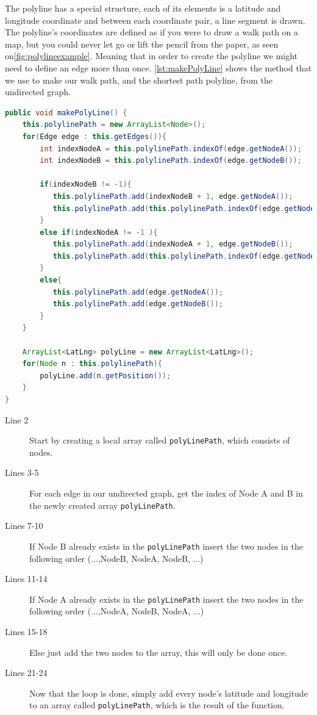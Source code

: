 The polyline has a special structure, each of its elements is a latitude and longitude coordinate and between each coordinate pair, a line segment is drawn. The polyline's coordinates are defined as if you were to draw a walk path on a map, but you could never let go or lift the pencil from the paper, as seen on\autoref{fig:polylineexample}. Meaning that in order to create the polyline we might need to define an edge more than once. \autoref{lst:makePolyLine} shows the method that we use to make our walk path, and the shortest path polyline, from the undirected graph.
\begin{lstlisting}[language=java, label=lst:makePolyLine, caption=makePolyLine]
public void makePolyLine() {
    this.polylinePath = new ArrayList<Node>();
    for(Edge edge : this.getEdges()){
        int indexNodeA = this.polylinePath.indexOf(edge.getNodeA());
        int indexNodeB = this.polylinePath.indexOf(edge.getNodeB());
        
        if(indexNodeB != -1){
           this.polylinePath.add(indexNodeB + 1, edge.getNodeA());
           this.polylinePath.add(this.polylinePath.indexOf(edge.getNodeA())+1, edge.getNodeB());
        }
        else if(indexNodeA != -1 ){
           this.polylinePath.add(indexNodeA + 1, edge.getNodeB());
           this.polylinePath.add(this.polylinePath.indexOf(edge.getNodeB())+1, edge.getNodeA());
        }
        else{
           this.polylinePath.add(edge.getNodeA());
           this.polylinePath.add(edge.getNodeB());
        }
    }

    ArrayList<LatLng> polyLine = new ArrayList<LatLng>();
    for(Node n : this.polylinePath){
        polyLine.add(n.getPosition());
    }
}
\end{lstlisting}
\begin{description}
\item[Line 2] Start by creating a local array called  \lstinline|polyLinePath|, which consists of nodes.
\item[Lines 3-5] For each edge in our undirected graph, get the index of Node A and B in the newly created array \lstinline|polyLinePath|.
\item[Lines 7-10] If Node B already exists in the \lstinline|polyLinePath| insert the two nodes in the following order (...,NodeB, NodeA, NodeB, ...)
\item[Lines 11-14] If Node A already exists in the \lstinline|polyLinePath| insert the two nodes in the following order (...,NodeA, NodeB, NodeA, ...)
\item[Lines 15-18] Else just add the two nodes to the array, this will only be done once.
\item[Lines 21-24] Now that the loop is done, simply add every node's latitude and longitude to an array called \lstinline|polyLinePath|, which is the result of the function. 
\end{description}

